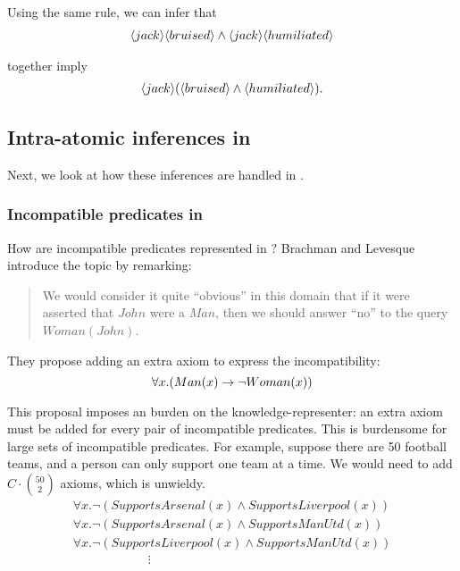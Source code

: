 \NI Using the same rule, we can infer that
\begin{eqnarray*}
   \langle jack \rangle \langle bruised \rangle \land \langle jack \rangle \langle humiliated \rangle \end{eqnarray*}

\NI together imply
\begin{eqnarray*}
\langle jack \rangle (\langle bruised \rangle \land \langle humiliated \rangle ).
\end{eqnarray*}
 
\subsection{Intra-atomic inferences in \fol{}}
Next, we look at how these inferences are handled in \fol{}.

\subsubsection{Incompatible predicates in \fol{}}\label{incompatiblepredicatesinfol}

\NI How are incompatible predicates represented in \fol{}?  Brachman
and Levesque \cite{brachman} introduce the topic by remarking:
\begin{quote}
   We would consider it quite ``obvious'' in this domain that if it
   were asserted that $John$ were a $Man$, then we should answer
   ``no'' to the query $Woman(John)$.
\end{quote}

\NI They propose adding an extra axiom to express the incompatibility:
\[
   \forall x. ( Man(x) \rightarrow \neg Woman(x) )
\]  
 
\NI This proposal imposes an burden on the knowledge-representer: an
extra axiom must be added for every pair of incompatible predicates.
This is burdensome for large sets of incompatible predicates.  For
example, suppose there are 50 football teams, and a person can only
support one team at a time.  We would need to add $C \cdot {50 \choose
  2}$ axioms, which is unwieldy.
\[
\begin{array}{l}
  \forall x.  \neg (SupportsArsenal(x) \land SupportsLiverpool(x))  \\
  \forall x.  \neg (SupportsArsenal(x) \land SupportsManUtd(x))  \\
  \forall x.  \neg (SupportsLiverpool(x) \land SupportsManUtd(x))  \\
  \qquad \qquad \qquad \vdots
\end{array}
\]


